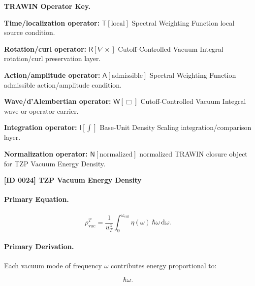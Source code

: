 \par\vspace{0.45\baselineskip}
\noindent\begin{minipage}[t]{\linewidth}
\begingroup
\small
\raggedright
\textbf{TRAWIN Operator Key.}\par
\noindent\textbf{Time/localization operator:} $\mathsf{T}\!\left[\mathrm{local}\right]$ Spectral Weighting Function local source condition.\par
\noindent\textbf{Rotation/curl operator:} $\mathsf{R}\!\left[\nabla\times\right]$ Cutoff-Controlled Vacuum Integral rotation/curl preservation layer.\par
\noindent\textbf{Action/amplitude operator:} $\mathsf{A}\!\left[\mathrm{admissible}\right]$ Spectral Weighting Function admissible action/amplitude condition.\par
\noindent\textbf{Wave/d'Alembertian operator:} $\mathsf{W}\!\left[\Box\right]$ Cutoff-Controlled Vacuum Integral wave or operator carrier.\par
\noindent\textbf{Integration operator:} $\mathsf{I}\!\left[\int\right]$ Base-Unit Density Scaling integration/comparison layer.\par
\noindent\textbf{Normalization operator:} $\mathsf{N}\!\left[\mathrm{normalized}\right]$ normalized TRAWIN closure object for TZP Vacuum Energy Density.\par
\endgroup
\end{minipage}

\clearpage
\noindent\textbf{[ID 0024] TZP Vacuum Energy Density}\par
\vspace{0.35em}
\paragraph{Primary Equation.}
\begin{equation}
\rho_{\mathrm{vac}}^{T}
=
\frac{1}{u_T^4}
\int_{0}^{\omega_{\mathrm{cut}}}
\eta(\omega)\,
\hbar\omega\,
\mathrm{d}\omega .
\end{equation}

\paragraph{Primary Derivation.}
Each vacuum mode of frequency $\omega$ contributes energy proportional to:

\begin{equation}
\hbar\omega .
\end{equation}

